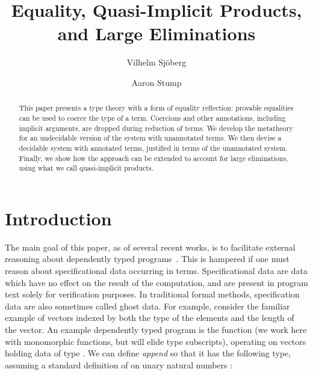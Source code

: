 \documentclass[copyright]{eptcs}
\begin{document}
\pagestyle{empty}


\newif \ifTR \TRfalse

\title{Equality, Quasi-Implicit Products, and Large Eliminations}
\author{Vilhelm Sj\"oberg
\and
Aaron Stump 
}

\date{}

\def\authorrunning{Sj\"oberg and Stump}
\def\titlerunning{Equality and Implicit Products}

\maketitle
\thispagestyle{empty}

\begin{abstract}
This paper presents a type theory with a form of equality reflection:
provable equalities can be used to coerce the type of a term.
Coercions and other annotations, including implicit arguments, are
dropped during reduction of terms.  We develop the metatheory for an
undecidable version of the system with unannotated terms.  We then
devise a decidable system with annotated terms, justified in terms of
the unannotated system.  Finally, we show how the approach can be
extended to account for large eliminations, using what we call
quasi-implicit products.
\end{abstract}

\section{Introduction}
\label{sec:intro}

The main goal of this paper, as of several recent works, is to
facilitate external reasoning about dependently typed
programs~\cite{mishra-linger+08,barras+08}.  This is hampered if one
must reason about specificational data occurring in terms.
Specificational data are data which have no effect on the result of
the computation, and are present in program text solely for
verification purposes.  In traditional formal methods, specification
data are also sometimes called ghost data.  For example, consider the
familiar example of vectors  indexed by
both the type  of the elements and the length  of the vector.
An example dependently typed program is the 
function (we work here with monomorphic functions, but will elide type
subscripts), operating on vectors holding data of type .  We can
define \textit{append} so that it has the following type, assuming a
standard definition of  on unary natural numbers
:
\end{document}
